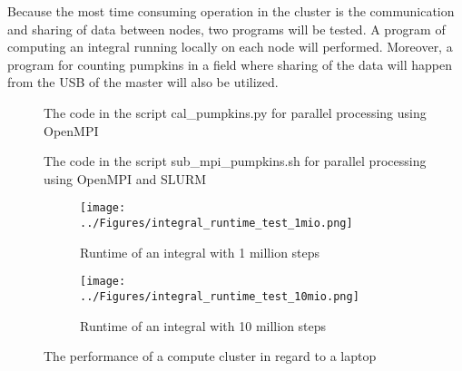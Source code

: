 \documentclass[../Head/Report.tex]{subfiles}
\begin{document}
Because the most time consuming operation in the cluster is the communication and sharing of data between nodes, two programs will be tested. A program of computing an integral running locally on each node will performed. Moreover, a program for counting pumpkins in a field where sharing of the data will happen from the USB of the master will also be utilized.    





\begin{figure}[H]
\centering
\begin{minipage}{0.9\textwidth}

\end{minipage}
\caption{The code in the script cal\_pumpkins.py for parallel processing using OpenMPI}
\label{fig:cal_pumpkins.py}
\end{figure}

\begin{figure}[H]
\centering
\begin{minipage}{0.9\textwidth}

\end{minipage}
\caption{The code in the script sub\_mpi\_pumpkins.sh for parallel processing using OpenMPI and SLURM}
\label{fig:cal_pumpkins.py}
\end{figure}

\begin{figure}[H]
\centering
  \begin{subfigure}[b]{0.48\textwidth}
  \centering
    \texttt{[image: ../Figures/integral\_runtime\_test\_1mio.png]}
    \caption{Runtime of an integral with 1 million steps}
    \label{fig:integral_runtime_1mio}
  \end{subfigure}
  \hfill
  \begin{subfigure}[b]{0.48\textwidth}
  \centering
    \texttt{[image: ../Figures/integral\_runtime\_test\_10mio.png]}
    \caption{Runtime of an integral with 10 million steps}
    \label{fig:integral_runtime_10mio}
  \end{subfigure}
  \caption{The performance of a compute cluster in regard to a laptop}
\end{figure}
\end{document}
